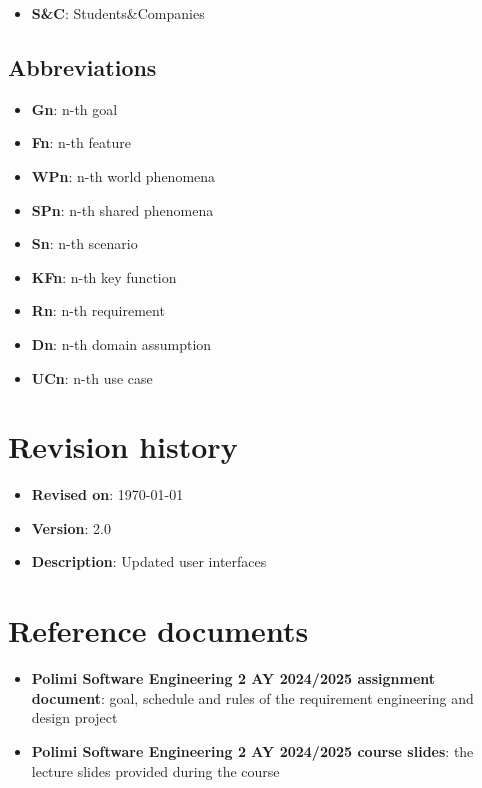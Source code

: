 \begin{itemize}
    \item \textbf{S\&C}: Students\&Companies
\end{itemize}

\subsection{Abbreviations}

\begin{itemize}
    \item \textbf{Gn}: n-th goal
    \item \textbf{Fn}: n-th feature
    \item \textbf{WPn}: n-th world phenomena
    \item \textbf{SPn}: n-th shared phenomena
    \item \textbf{Sn}: n-th scenario
    \item \textbf{KFn}: n-th key function
    \item \textbf{Rn}: n-th requirement
    \item \textbf{Dn}: n-th domain assumption
    \item \textbf{UCn}: n-th use case
\end{itemize}

\section{Revision history}

\begin{itemize}
    \item \textbf{Revised on}: \today
    \item \textbf{Version}: 2.0
    \item \textbf{Description}: Updated user interfaces
\end{itemize}

\section{Reference documents}

\begin{itemize}
    \item \textbf{Polimi Software Engineering 2 AY 2024/2025 assignment document}: goal, schedule and rules of the requirement engineering and design project
    \item \textbf{Polimi Software Engineering 2 AY 2024/2025 course slides}: the lecture slides provided during the course
\end{itemize}

